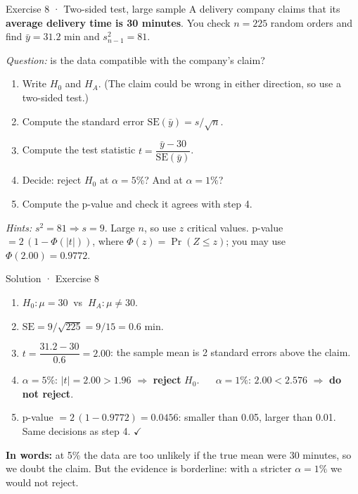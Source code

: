 \documentclass[
  11pt,
  ignorenonframetext,
  aspectratio=169,
]{beamer}
\providecommand{\tightlist}{%
  \setlength{\itemsep}{0pt}\setlength{\parskip}{0pt}}
\newcommand{\se}{\mathrm{SE}}
\begin{document}
\begin{frame}{Exercise 8 · Two-sided test, large sample}
\protect{}\label{exercise-8-two-sided-test-large-sample}
A delivery company claims that its \textbf{average delivery time is 30
minutes}. You check \(n=225\) random orders and find \(\bar y=31.2\) min
and \(s^2_{n-1}=81\).

\emph{Question:} is the data compatible with the company's claim?

\begin{enumerate}
\tightlist
\item
  Write \(H_0\) and \(H_A\). (The claim could be wrong in either
  direction, so use a two-sided test.)
\item
  Compute the standard error \(\se(\bar y)=s/\sqrt n\).
\item
  Compute the test statistic \(t=\dfrac{\bar y-30}{\se(\bar y)}\).
\item
  Decide: reject \(H_0\) at \(\alpha=5\%\)? And at \(\alpha=1\%\)?
\item
  Compute the p-value and check it agrees with step 4.
\end{enumerate}

\emph{Hints:} \(s^2=81\Rightarrow s=9\). Large \(n\), so use \(z\)
critical values. p-value \(=2\,(1-\Phi(|t|))\), where
\(\Phi(z)=\Pr(Z\le z)\); you may use \(\Phi(2.00)=0.9772\).
\end{frame}

\begin{frame}{Solution · Exercise 8}
\protect{}\label{solution-exercise-8}
\begin{enumerate}
\tightlist
\item
  \(H_0:\mu=30\ \) vs \(\ H_A:\mu\neq30\).
\item
  \(\se=9/\sqrt{225}=9/15=\mathbf{0.6}\) min.
\item
  \(t=\dfrac{31.2-30}{0.6}=\mathbf{2.00}\): the sample mean is 2
  standard errors above the claim.
\item
  \(\alpha=5\%\): \(|t|=2.00>1.96\) \(\Rightarrow\) \textbf{reject}
  \(H_0\). \(\quad\) \(\alpha=1\%\): \(2.00<2.576\) \(\Rightarrow\)
  \textbf{do not reject}.
\item
  p-value \(=2\,(1-0.9772)=\mathbf{0.0456}\): smaller than 0.05, larger
  than 0.01. Same decisions as step 4. \(\checkmark\)
\end{enumerate}

\textbf{In words:} at 5\% the data are too unlikely if the true mean were
30 minutes, so we doubt the claim. But the evidence is borderline: with a
stricter \(\alpha=1\%\) we would not reject.
\end{frame}
\end{document}
